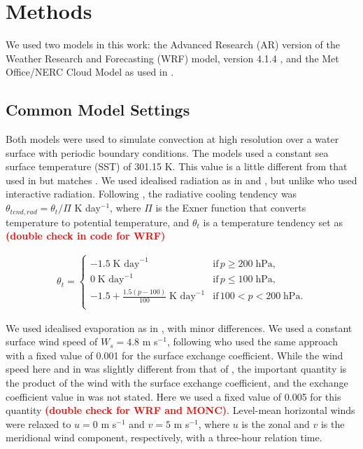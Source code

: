 \documentclass[draft]{agujournal2019}
\newcommand{\todo}[1]{\textcolor{red}{\textbf{(#1)}}}
\begin{document}
\section{Methods}
\label{sec:methods}

We used two models in this work: the Advanced Research (AR) version of the
Weather Research and Forecasting (WRF) model, version 4.1.4
\cite{Skamarock_2019}, and the Met Office/NERC Cloud Model
\cite<MONC,>{Brown_2020} as used in .

\subsection{Common Model Settings}

Both models were used to simulate convection at high resolution over a water
surface with periodic boundary conditions. The models used a constant sea
surface temperature (SST) of 301.15 K. This value is a little different from
that used in  but matches . We
used idealised radiation as in  and
, but unlike  who used interactive
radiation. Following , the radiative cooling tendency
was $\theta_{tend,rad} = \theta_t/\Pi$ K day$^{-1}$, where $\Pi$ is the Exner
function that converts temperature to potential temperature, and $\theta_t$ is a
temperature tendency set as \todo{double check in code for WRF}

\begin{align}
 \theta_t = \begin{cases}
    -1.5\; \textrm{K day}^{-1} & \textrm{if}\, p \geq 200\; \textrm{hPa}, \\
    0\; \textrm{K day}^{-1} & \textrm{if}\, p \leq 100\; \textrm{hPa}, \\
    -1.5 + \frac{1.5 (p-100)}{100}\; \textrm{K day}^{-1} & \textrm{if}\, 100 < p < 200\; \textrm{hPa}. \\
 \end{cases}
\end{align}

We used idealised evaporation as in , with minor
differences. We used a constant surface wind speed of $W_s = 4.8$ m s$^{-1}$,
following  who used the same approach with a fixed value
of 0.001 for the surface exchange coefficient. While the wind speed here and in
 was slightly different from that of
, the important quantity is the product of the wind with
the surface exchange coefficient, and the exchange coefficient value in
 was not stated. Here we used a fixed value of 0.005 for
this quantity \todo{double check for WRF and MONC}. Level-mean horizontal winds
were relaxed to $u = 0$ m s$^{-1}$ and $v = 5$ m s$^{-1}$, where $u$ is the
zonal and $v$ is the meridional wind component, respectively, with a three-hour
relation time.
\end{document}
